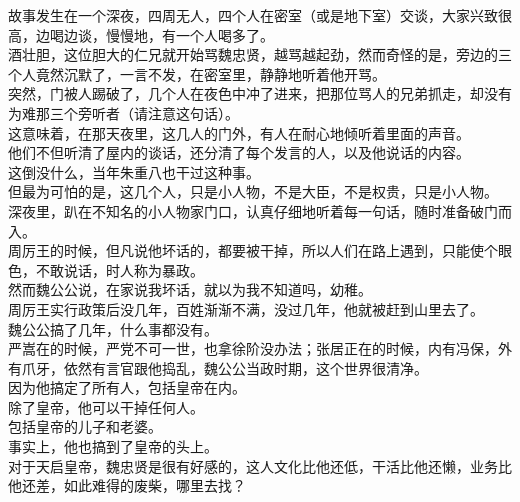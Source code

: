 \begin{multicols}{\theparacolNo}
故事发生在一个深夜，四周无人，四个人在密室（或是地下室）交谈，大家兴致很高，边喝边谈，慢慢地，有一个人喝多了。\\

酒壮胆，这位胆大的仁兄就开始骂魏忠贤，越骂越起劲，然而奇怪的是，旁边的三个人竟然沉默了，一言不发，在密室里，静静地听着他开骂。\\

突然，门被人踢破了，几个人在夜色中冲了进来，把那位骂人的兄弟抓走，却没有为难那三个旁听者（请注意这句话）。\\

这意味着，在那天夜里，这几人的门外，有人在耐心地倾听着里面的声音。\\

他们不但听清了屋内的谈话，还分清了每个发言的人，以及他说话的内容。\\

这倒没什么，当年朱重八也干过这种事。\\

但最为可怕的是，这几个人，只是小人物，不是大臣，不是权贵，只是小人物。\\

深夜里，趴在不知名的小人物家门口，认真仔细地听着每一句话，随时准备破门而入。\\

周厉王的时候，但凡说他坏话的，都要被干掉，所以人们在路上遇到，只能使个眼色，不敢说话，时人称为暴政。\\

然而魏公公说，在家说我坏话，就以为我不知道吗，幼稚。\\

周厉王实行政策后没几年，百姓渐渐不满，没过几年，他就被赶到山里去了。\\

魏公公搞了几年，什么事都没有。\\

严嵩在的时候，严党不可一世，也拿徐阶没办法；张居正在的时候，内有冯保，外有爪牙，依然有言官跟他捣乱，魏公公当政时期，这个世界很清净。\\

因为他搞定了所有人，包括皇帝在内。\\

除了皇帝，他可以干掉任何人。\\

包括皇帝的儿子和老婆。\\

事实上，他也搞到了皇帝的头上。\\

对于天启皇帝，魏忠贤是很有好感的，这人文化比他还低，干活比他还懒，业务比他还差，如此难得的废柴，哪里去找？\\


\end{multicols}
